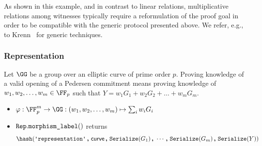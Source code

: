 \documentclass[11pt]{article}
\begin{document}
As shown in this example, and in contrast to linear relations, multiplicative relations among witnesses typically require a reformulation of the proof goal in order to be compatible with the generic protocol presented above.
We refer, e.g., to Krenn~\cite{krenn12} for generic techniques.


\subsubsection{Representation}
Let $\GG$ be a group over an elliptic curve of prime order $p$.
Proving knowledge of a valid opening of a Pedersen commitment means proving knowledge of $w_1,w_2, \dots, w_m\in\FF_p$ such that $Y=w_1G_1 + w_2G_2 + \dots + w_m G_m$.


\begin{itemize}
  \item $\varphi:\FF_p^m\to\GG:(w_1,w_2, \dots, w_m)\mapsto \sum_i w_iG_i$
  \item $\texttt{Rep}.\texttt{morphism\_label}()$ returns
  \[
    \hash(\replabel \concat \curvectx \concat \serialize(G_1) \concat \cdots \concat \serialize(G_m) \concat \serialize(Y))
  \]
\end{itemize}
\end{document}
